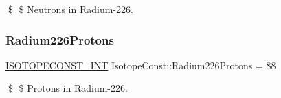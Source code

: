 \$ \$ Neutrons in Radium-\/226. \mbox{\label{group___isotope_const-_radium-_ra226_ga61a91acc285b37e8273745176cf936fa}} 
\subsubsection{\texorpdfstring{Radium226\+Protons}{Radium226Protons}}
{\footnotesize\ttfamily \mbox{\hyperlink{group___isotope_const-_macros_ga5f18360b3e99483a35c32d789e62621c}{I\+S\+O\+T\+O\+P\+E\+C\+O\+N\+S\+T\+\_\+\+I\+NT}} Isotope\+Const\+::\+Radium226\+Protons = 88}

\$ \$ Protons in Radium-\/226. 